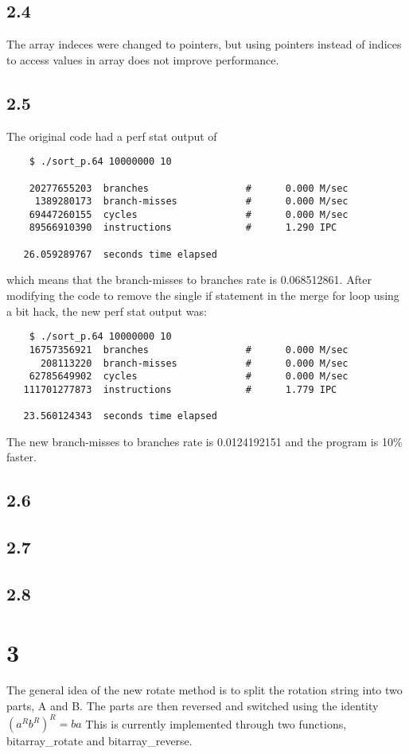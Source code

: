 \documentclass[12pt]{article}
\begin{document}
\subsection{2.4}
The array indeces were changed to pointers, but using pointers instead of 
indices to access values in array does not improve performance.

\subsection{2.5}
The original code had a perf stat output of 
\begin{verbatim}
    $ ./sort_p.64 10000000 10

    20277655203  branches                 #      0.000 M/sec
     1389280173  branch-misses            #      0.000 M/sec
    69447260155  cycles                   #      0.000 M/sec
    89566910390  instructions             #      1.290 IPC  

   26.059289767  seconds time elapsed
\end{verbatim}
which means that the branch-misses to branches rate is 0.068512861.  After 
modifying the code to remove the single if statement in the merge for loop 
using a bit hack, the new perf stat output was:
\begin{verbatim}
    $ ./sort_p.64 10000000 10
    16757356921  branches                 #      0.000 M/sec
      208113220  branch-misses            #      0.000 M/sec
    62785649902  cycles                   #      0.000 M/sec
   111701277873  instructions             #      1.779 IPC

   23.560124343  seconds time elapsed
\end{verbatim}
The new branch-misses to branches rate is 0.0124192151 and the program is 10\% 
faster.  
\subsection{2.6}

\subsection{2.7}

\subsection{2.8}

\section{3}
The general idea of the new rotate method is to split the rotation string into 
two parts, A and B.  The parts are then reversed and switched using the identity 
$(a^R b^R)^R = ba$  This is currently implemented through two functions, 
bitarray_rotate and bitarray_reverse.  
\end{document}
